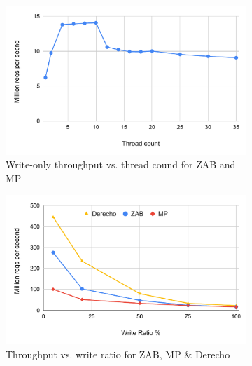 \begin{figure}[t]
\centering
  \begin{subfigure}[b]{0.33\textwidth}
    \includegraphics[width=\textwidth]{1_figures/ZAB-scal.pdf}
    \captionsetup{width=0.85\linewidth}
    \caption{Write-only throughput vs. thread cound for ZAB and MP}
  \label{fig:zab-scal}
  \end{subfigure}
  \begin{subfigure}[b]{0.33\textwidth}
    \includegraphics[width=\textwidth]{1_figures/zab-mp-dr.pdf}
    \captionsetup{width=0.85\linewidth}
    \caption{Throughput vs. write ratio for ZAB, MP \& Derecho}
  \label{fig:zab-mp-dr}
  \end{subfigure}
  \begin{subfigure}[b]{0.33\textwidth} 
  

\end{subfigure}
\end{figure}
